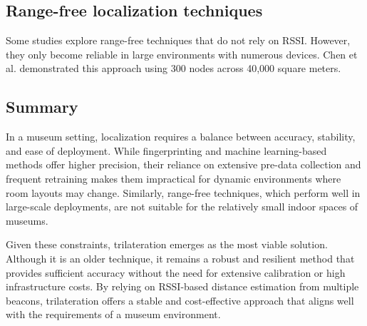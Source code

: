 \subsection{Range-free localization techniques}

Some studies explore range-free techniques that do not rely on RSSI. However, they only become reliable in large environments with numerous devices. Chen et al. \cite{chen_range-free_2013} demonstrated this approach using 300 nodes across 40,000 square meters.  

\subsection{Summary}

In a museum setting, localization requires a balance between accuracy, stability, and ease of deployment. While fingerprinting and machine learning-based methods offer higher precision, their reliance on extensive pre-data collection and frequent retraining makes them impractical for dynamic environments where room layouts may change. Similarly, range-free techniques, which perform well in large-scale deployments, are not suitable for the relatively small indoor spaces of museums.  

Given these constraints, trilateration emerges as the most viable solution. Although it is an older technique, it remains a robust and resilient method that provides sufficient accuracy without the need for extensive calibration or high infrastructure costs. By relying on RSSI-based distance estimation from multiple beacons, trilateration offers a stable and cost-effective approach that aligns well with the requirements of a museum environment.